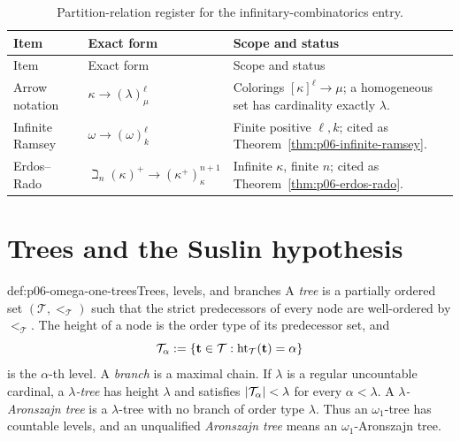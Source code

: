 \begingroup\small
\begin{longtable}{@{}p{}p{}p{}@{}}
\caption{Partition-relation register for the infinitary-combinatorics
entry.}\label{tab:p06-partition-relations}\\
\toprule
Item & Exact form & Scope and status \\
\midrule
\endfirsthead
\toprule
Item & Exact form & Scope and status \\
\midrule
\endhead
Arrow notation &
\(\kappa\longrightarrow(\lambda)^\ell_\mu\) &
Colorings \([\kappa]^\ell\to\mu\); a homogeneous set has cardinality
exactly \(\lambda\). \\
\addlinespace
Infinite Ramsey &
\(\omega\longrightarrow(\omega)^\ell_k\) &
Finite positive \(\ell,k\); cited as Theorem~\ref{thm:p06-infinite-ramsey}. \\
\addlinespace
Erdos--Rado &
\(\beth_n(\kappa)^+\longrightarrow(\kappa^+)^{n+1}_\kappa\) &
Infinite \(\kappa\), finite \(n\); cited as
Theorem~\ref{thm:p06-erdos-rado}. \\
\bottomrule
\end{longtable}
\endgroup

\section{Trees and the Suslin hypothesis}
\label{sec:p06-trees-suslin}

\begin{hbdefinition}{def:p06-omega-one-trees}{Trees, levels, and branches}
A \emph{tree} is a partially ordered set \((\mathcal T,<_{\mathcal T})\) such
that the strict predecessors of every node are well-ordered by
\(<_{\mathcal T}\).  The height of a
node is the order type of its predecessor set, and
\[
  \mathcal T_\alpha\mathrel{:=}
  \{\mathbf t\in\mathcal T:
    \operatorname{ht}_{\mathcal T}(\mathbf t)=\alpha\}
\]
is the \(\alpha\)-th level.  A \emph{branch} is a maximal chain.  If
\(\lambda\) is a regular uncountable cardinal, a \emph{\(\lambda\)-tree}
has height \(\lambda\) and satisfies \(\lvert\mathcal T_\alpha\rvert<\lambda\) for every
\(\alpha<\lambda\).  A \emph{\(\lambda\)-Aronszajn tree} is a
\(\lambda\)-tree with no branch of order type \(\lambda\).  Thus an
\(\omega_1\)-tree has countable levels, and an unqualified
\emph{Aronszajn tree} means an \(\omega_1\)-Aronszajn tree.
\end{hbdefinition}

